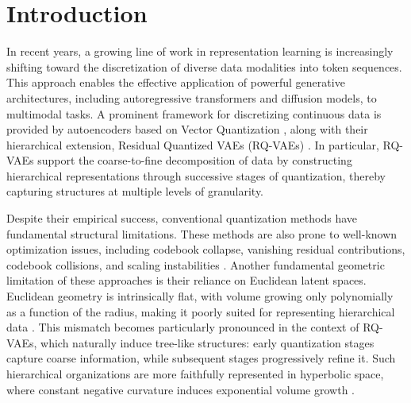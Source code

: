 \documentclass[12pt]{report}
\begin{document}
\chapter{Introduction} 
In recent years, a growing line of work in representation learning is increasingly shifting toward the discretization of diverse data modalities into token sequences. This approach enables the effective application of powerful generative architectures, including autoregressive transformers and diffusion models, to multimodal tasks.
A prominent framework for discretizing continuous data is provided by autoencoders based on Vector Quantization \cite{originalvq, vqvae, finitescalarquantizationfsq, gumbelvq, vqnew}, along with their hierarchical extension, Residual Quantized VAEs (RQ-VAEs) \cite{soundstream}. In particular, RQ-VAEs support the coarse-to-fine decomposition of data \cite{lee2022rqvae} by constructing hierarchical representations through successive stages of quantization, thereby capturing structures at multiple levels of granularity.

Despite their empirical success, conventional quantization methods have fundamental structural limitations. These methods are also prone to well-known optimization issues, including codebook collapse, vanishing residual contributions, codebook collisions, and scaling instabilities \cite{collapse_1, collapse_2}.
Another fundamental geometric limitation of these approaches is their reliance on Euclidean latent spaces. Euclidean geometry is intrinsically flat, with volume growing only polynomially as a function of the radius, making it poorly suited for representing hierarchical data \cite{sala2018representation}. This mismatch becomes particularly pronounced in the context of RQ-VAEs, which naturally induce tree-like structures: early quantization stages capture coarse information, while subsequent stages progressively refine it. Such hierarchical organizations are more faithfully represented in hyperbolic space, where constant negative curvature induces exponential volume growth \cite{cannon1997hyperbolic}.
\end{document}
